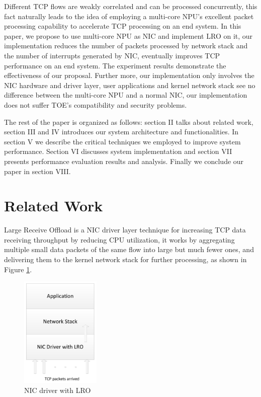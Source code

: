 \documentclass[conference]{IEEEtran}
\begin{document}
Different TCP flows are weakly correlated and can be processed concurrently, this fact naturally leads to the idea of employing a multi-core NPU's excellent packet processing capability to accelerate TCP processing on an end system. In this paper, we propose to use multi-core NPU as NIC and implement LRO on it, our implementation reduces the number of packets processed by network stack and the number of interrupts generated by NIC, eventually improves TCP performance on an end system. The experiment results demonstrate the effectiveness of our proposal. Further more, our implementation only involves the NIC hardware and driver layer, user applications and kernel network stack see no difference between the multi-core NPU and a normal NIC, our implementation does not suffer TOE's compatibility and security problems.

The rest of the paper is organized as follows: section II talks about related work, section III and IV introduces our system architecture and functionalities. In section V we describe the critical techniques we employed to improve system performance. Section VI discusses system implementation and section VII presents performance evaluation results and analysis. Finally we conclude our paper in section VIII.
\section{Related Work}
Large Receive Offload is a NIC driver layer technique for increasing TCP data receiving throughput by reducing CPU utilization, it works by aggregating multiple small data packets of the same flow into large but much fewer ones, and delivering them to the kernel network stack for further processing, as shown in Figure \ref{driver_with_lro}.
\begin{figure}[!t]
\centering
\includegraphics[width=1.5in]{nic_driver_with_lro}
\caption{NIC driver with LRO}
\label{driver_with_lro}
\end{figure}
\end{document}
